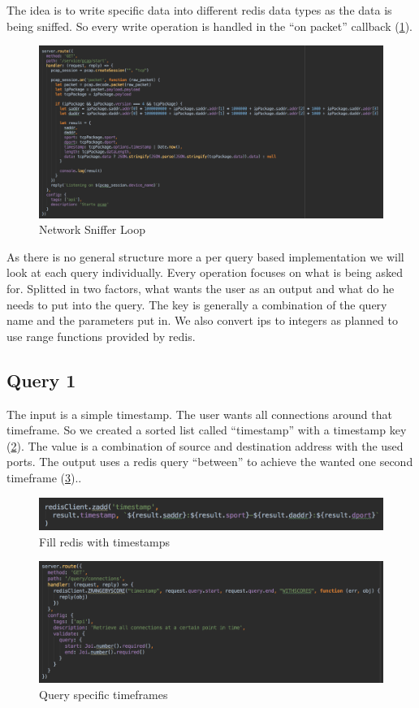 The idea is to write specific data into different redis data types as the data is being sniffed. So every write operation is handled in the “on packet” callback (\ref{loop}).
  \begin{figure}[htb!]
	\centerline{\includegraphics[width=1.0\textwidth]{resources/solution2-1.png}}
	\caption{Network Sniffer Loop}
		\label{loop}
\end{figure}
As there is no general structure more a per query based implementation we will look at each query individually. Every operation focuses on what is being asked for. Splitted in two factors, what wants the user as an output and what do he needs to put into the query. The key is generally a combination of the query name and the parameters put in. We also convert ips to integers as planned to use range functions provided by redis.

\subsection{Query 1}
The input is a simple timestamp. The user wants all connections around that timeframe. So we created a sorted list called “timestamp” with a timestamp key (\ref{query1}). The value is a combination of source and destination address with the used ports. The output uses a redis query “between” to achieve the wanted one second timeframe (\ref{query11})..

  \begin{figure}[htb!]
	\centerline{\includegraphics[width=1.0\textwidth]{resources/solution2-2.png}}
	\caption{Fill redis with timestamps}
	\label{query1}
\end{figure}

  \begin{figure}[htb!]
	\centerline{\includegraphics[width=1.0\textwidth]{resources/solution2-3.png}}
	\caption{Query specific timeframes}
	\label{query11}
\end{figure}

